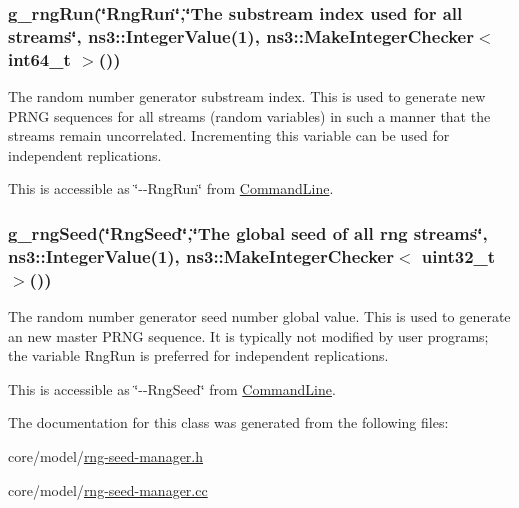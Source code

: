 \subsubsection[{\texorpdfstring{g\+\_\+rng\+Run}{g_rngRun}}]{ g\+\_\+rng\+Run(\char`\"{}Rng\+Run\char`\"{},\char`\"{}The substream index used for {\bf all} streams\char`\"{}, ns3\+::\+Integer\+Value(1), {\bf ns3\+::\+Make\+Integer\+Checker}$<$ int64\+\_\+t $>$())\hspace{0.3cm}{\ttfamily [related]}}\hypertarget{classns3_1_1RngSeedManager_afbf0a3626bab3583b076eec1c46ecd98}{}\label{classns3_1_1RngSeedManager_afbf0a3626bab3583b076eec1c46ecd98}
The random number generator substream index. This is used to generate new P\+R\+NG sequences for all streams (random variables) in such a manner that the streams remain uncorrelated. Incrementing this variable can be used for independent replications.

This is accessible as \char`\"{}-\/-\/\+Rng\+Run\char`\"{} from \hyperlink{classns3_1_1CommandLine}{Command\+Line}. 
\subsubsection[{\texorpdfstring{g\+\_\+rng\+Seed}{g_rngSeed}}]{ g\+\_\+rng\+Seed(\char`\"{}Rng\+Seed\char`\"{},\char`\"{}The global seed of {\bf all} rng streams\char`\"{}, ns3\+::\+Integer\+Value(1), {\bf ns3\+::\+Make\+Integer\+Checker}$<$ uint32\+\_\+t $>$())\hspace{0.3cm}{\ttfamily [related]}}\hypertarget{classns3_1_1RngSeedManager_ae865165116e0452b813b18bbd03eaf98}{}\label{classns3_1_1RngSeedManager_ae865165116e0452b813b18bbd03eaf98}
The random number generator seed number global value. This is used to generate an new master P\+R\+NG sequence. It is typically not modified by user programs; the variable Rng\+Run is preferred for independent replications.

This is accessible as \char`\"{}-\/-\/\+Rng\+Seed\char`\"{} from \hyperlink{classns3_1_1CommandLine}{Command\+Line}. 

The documentation for this class was generated from the following files\+:\begin{DoxyCompactItemize}
\item 
core/model/\hyperlink{rng-seed-manager_8h}{rng-\/seed-\/manager.\+h}\item 
core/model/\hyperlink{rng-seed-manager_8cc}{rng-\/seed-\/manager.\+cc}\end{DoxyCompactItemize}

